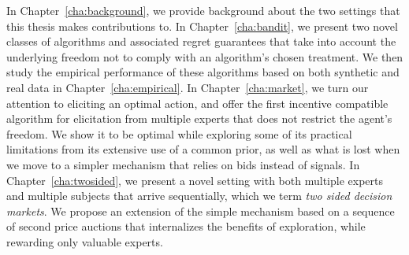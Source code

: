 In Chapter~\ref{cha:background}, we provide background about the two settings that this thesis makes contributions to. In Chapter~\ref{cha:bandit}, we present two novel classes of algorithms and associated regret guarantees that take into account the underlying freedom not to comply with an algorithm's chosen treatment. We then study the empirical performance  of these algorithms based on both synthetic and real data in Chapter~\ref{cha:empirical}.
In Chapter~\ref{cha:market}, we turn our attention to eliciting an optimal action, and offer the first incentive compatible algorithm for elicitation from multiple experts that does not restrict the agent's freedom. We show it to be optimal while exploring some of its practical limitations from its extensive use of a common prior, as well as what is lost when we move to a simpler mechanism that relies on bids instead of signals.
In Chapter~\ref{cha:twosided}, we present a novel setting with both multiple experts and multiple subjects that arrive sequentially, which we term \emph{two sided decision markets}. We propose an extension of the simple mechanism based on a sequence of second price auctions that internalizes the benefits of exploration, while rewarding only valuable experts.

